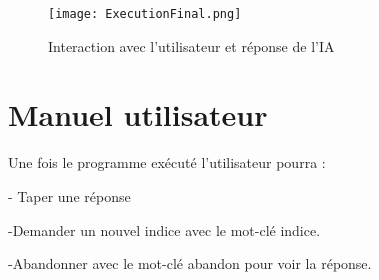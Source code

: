 \documentclass[a4paper, 12pt, twoside]{article}
\begin{document}
\begin{figure}[H]
  \centering
  \texttt{[image: ExecutionFinal.png]}
  \caption{Interaction avec l'utilisateur et réponse de l'IA}
\end{figure}

    
	\section{Manuel utilisateur}
      Une fois le programme exécuté l’utilisateur pourra :
    
     - Taper une réponse
     
     -Demander un nouvel indice avec le mot-clé indice.
     
     -Abandonner avec le mot-clé abandon pour voir la réponse.
\end{document}
